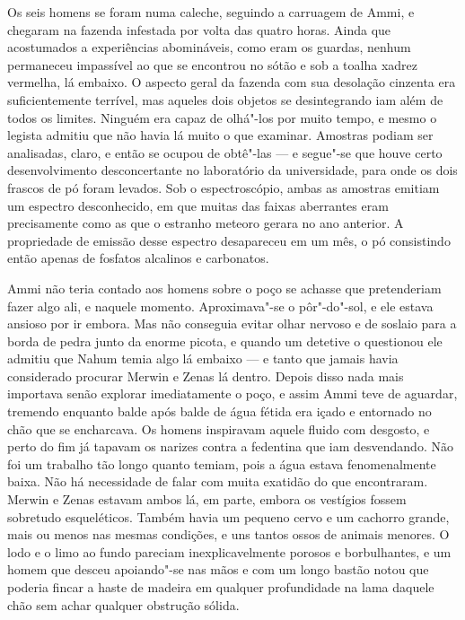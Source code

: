 Os seis homens se foram numa caleche, seguindo a carruagem de Ammi, e
chegaram na fazenda infestada por volta das quatro horas. Ainda que
acostumados a experiências abomináveis, como eram os guardas, nenhum
permaneceu impassível ao que se encontrou no sótão e sob a toalha xadrez
vermelha, lá embaixo. O aspecto geral da fazenda com sua desolação
cinzenta era suficientemente terrível, mas aqueles dois objetos se
desintegrando iam além de todos os limites. Ninguém era capaz de
olhá"-los por muito tempo, e mesmo o legista admitiu que não havia lá
muito o que examinar. Amostras podiam ser analisadas, claro, e então se
ocupou de obtê"-las --- e segue"-se
que houve certo desenvolvimento desconcertante no laboratório da
universidade, para onde os dois frascos de pó foram levados. Sob o
espectroscópio, ambas as amostras emitiam um espectro desconhecido, em
que muitas das faixas aberrantes eram precisamente como as que o
estranho meteoro gerara no ano anterior. A propriedade de emissão desse
espectro desapareceu em um mês, o pó consistindo então apenas de
fosfatos alcalinos e carbonatos.

Ammi não teria contado aos homens sobre o poço se achasse que
pretenderiam fazer algo ali, e naquele momento. Aproximava"-se o
pôr"-do"-sol, e ele estava ansioso por ir embora. Mas não conseguia evitar
olhar nervoso e de soslaio para a borda de pedra junto da enorme picota,
e quando um detetive o questionou ele admitiu que Nahum temia algo lá
embaixo --- e tanto que jamais
havia considerado procurar Merwin e Zenas lá dentro. Depois disso nada
mais importava senão explorar imediatamente o poço, e assim Ammi teve de
aguardar, tremendo enquanto balde após balde de água fétida era içado e
entornado no chão que se encharcava. Os homens inspiravam aquele fluido
com desgosto, e perto do fim já tapavam os narizes contra a fedentina
que iam desvendando. Não foi um trabalho tão longo quanto temiam, pois a
água estava fenomenalmente baixa. Não há necessidade de falar com muita
exatidão do que encontraram. Merwin e Zenas estavam ambos lá, em parte,
embora os vestígios fossem sobretudo esqueléticos. Também havia um
pequeno cervo e um cachorro grande, mais ou menos nas mesmas condições,
e uns tantos ossos de animais menores. O lodo e o limo ao fundo pareciam
inexplicavelmente porosos e borbulhantes, e um homem que desceu
apoiando"-se nas mãos e com um longo bastão notou que poderia fincar a
haste de madeira em qualquer profundidade na lama daquele chão sem achar
qualquer obstrução sólida.

